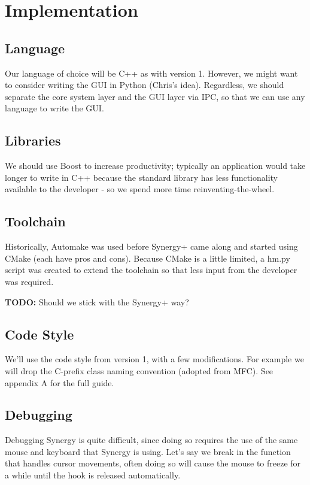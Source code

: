 \section{Implementation}

\subsection{Language}

Our language of choice will be C++ as with version 1. However, we might want to
consider writing the GUI in Python (Chris's idea). Regardless, we should 
separate the core system layer and the GUI layer via IPC, so that we can use
any language to write the GUI.

\subsection{Libraries}

We should use Boost to increase productivity; typically an application would
take longer to write in C++ because the standard library has less functionality
available to the developer - so we spend more time reinventing-the-wheel.

\subsection{Toolchain}

Historically, Automake was used before Synergy+ came along and started using
CMake (each have pros and cons). Because CMake is a little limited, a hm.py 
script was created to extend the toolchain so that less input from the developer
was required.

\textbf{TODO:} Should we stick with the Synergy+ way?

\subsection{Code Style}

We'll use the code style from version 1, with a few modifications. For example 
we will drop the C-prefix class naming convention (adopted from MFC). See 
appendix A for the full guide.

\subsection{Debugging}

Debugging Synergy is quite difficult, since doing so requires the use of the 
same mouse and keyboard that Synergy is using. Let's say we break in the 
function that handles cursor movements, often doing so will cause the mouse
to freeze for a while until the hook is released automatically.

